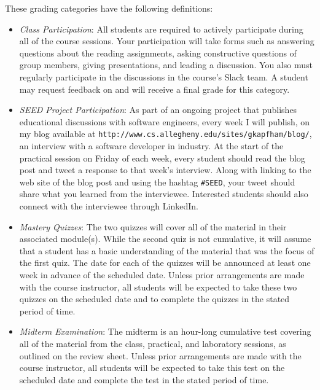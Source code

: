 \documentclass[11pt]{article}
\newcommand{\url}[1]{\lstinline{#1}}
\begin{document}
\vspace*{-.05in}

\noindent
These grading categories have the following definitions:

\vspace*{-.05in}

\begin{itemize}

  \item {\em Class Participation\/}: All students are required to actively participate during all of the course
    sessions. Your participation will take forms such as answering questions about the reading assignments, asking
    constructive questions of group members, giving presentations, and leading a discussion. You also must regularly
    participate in the discussions in the course's Slack team. A student may request feedback on and will receive a
    final grade for this category.

  \item {\em SEED Project Participation\/}: As part of an ongoing project that publishes educational discussions with
    software engineers, every week I will publish, on my blog available at
    \url{http://www.cs.allegheny.edu/sites/gkapfham/blog/}, an interview with a software developer in industry. At the
    start of the practical session on Friday of each week, every student should read the blog post and tweet a response
    to that week's interview. Along with linking to the web site of the blog post and using the hashtag \url{#SEED},
    your tweet should share what you learned from the interviewee. Interested students should also connect with the
    interviewee through LinkedIn.

  \item {\em Mastery Quizzes\/}: The two quizzes will cover all of the material in their associated module(s). While the
    second quiz is not cumulative, it will assume that a student has a basic understanding of the material that was the
    focus of the first quiz. The date for each of the quizzes will be announced at least one week in advance of the
    scheduled date. Unless prior arrangements are made with the course instructor, all students will be expected to take
    these two quizzes on the scheduled date and to complete the quizzes in the stated period of time.

  \item {\em Midterm Examination\/}: The midterm is an hour-long cumulative test covering all of the material from the
    class, practical, and laboratory sessions, as outlined on the review sheet. Unless prior arrangements are made with
    the course instructor, all students will be expected to take this test on the scheduled date and complete the test
    in the stated period of time.


\end{itemize}
\end{document}

